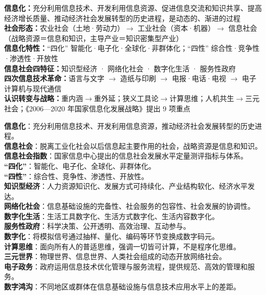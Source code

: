 \documentclass[a4paper,11pt]{article}
\begin{document}

\begin{knowmap}
\textbf{信息化：}充分利用信息技术、开发利用信息资源、促进信息交流和知识共享、提高经济增长质量、推动经济社会发展转型的历史进程，是动态的、渐进的过程\\[2pt]
\textbf{社会形态：}农业社会（土地·劳动力）$\rightarrow$ 工业社会（资本·机器）$\rightarrow$ 信息社会（战略资源＝信息和知识，主导产业＝知识密集型产业）\\[2pt]
\textbf{信息化特性：}“四化” 智能化·电子化·全球化·非群体化；“四性” 综合性·竞争性·渗透性·开放性\\[2pt]
\textbf{信息社会四特征：}知识型经济 · 网络化社会 · 数字化生活 · 服务性政府\\[2pt]
\textbf{四次信息技术革命：}语言与文字 $\rightarrow$ 造纸与印刷 $\rightarrow$ 电报·电话·电视 $\rightarrow$ 电子计算机与现代通信\\[2pt]
\textbf{认识转变与战略：}重内涵$\rightarrow$重外延；狭义工具论$\rightarrow$计算思维；人机共生$\rightarrow$三元社会；《2006—2020 年国家信息化发展战略》提出 9 项重点
\end{knowmap}

\begin{keyterms}
\textbf{信息化}：充分利用信息技术、开发利用信息资源，推动经济社会发展转型的历史进程。\\
\textbf{信息社会}：脱离工业化社会以后信息起主要作用的社会，战略资源是信息和知识。\\
\textbf{信息社会指数}：国家信息中心提出的信息社会发展水平定量测评指标与体系。\\
\textbf{“四化”}：智能化、电子化、全球化、非群体化。\\
\textbf{“四性”}：综合性、竞争性、渗透性、开放性。\\
\textbf{知识型经济}：人力资源知识化、发展方式可持续化、产业结构软化、经济水平发达。\\
\textbf{网络化社会}：信息基础设施的完备性、社会服务的包容性、社会发展的协调性。\\
\textbf{数字化生活}：生活工具数字化、生活方式数字化、生活内容数字化。\\
\textbf{服务性政府}：科学决策、公开透明、高效治理、互动参与。\\
\textbf{数字化}：将模拟信号通过抽样、量化、编码等环节变换成数字码元。\\
\textbf{计算思维}：面向所有人的普适思维，强调一切皆可计算，不是程序化思维。\\
\textbf{三元世界}：物理世界、信息世界、人类社会组成的动态开放网络社会。\\
\textbf{电子政务}：政府运用信息技术优化管理与服务流程，提供规范、高效的管理和服务。\\
\textbf{数字鸿沟}：不同地区或群体在信息基础设施与信息技术应用水平上的差距。
\end{keyterms}
\end{document}
